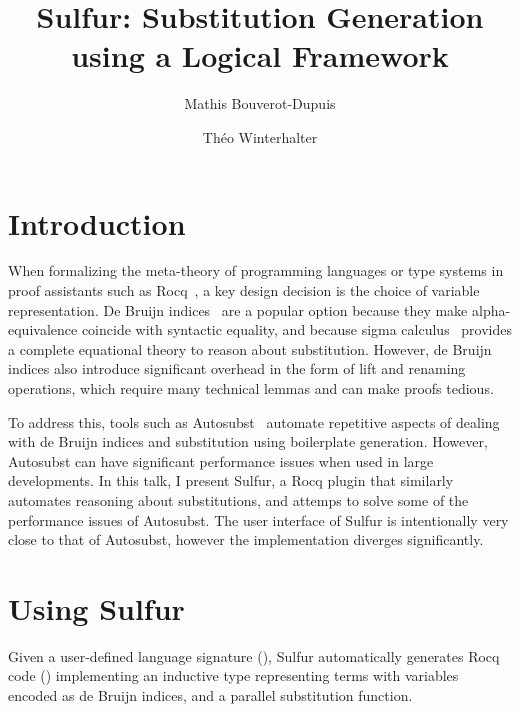 \documentclass[sigplan,review,anonymous]{acmart}
\title{Sulfur: Substitution Generation using a Logical Framework}
\author{
  Mathis Bouverot-Dupuis
  \and
  Théo Winterhalter
}
\begin{document}
\maketitle

\section{Introduction}

When formalizing the meta-theory of programming languages or type systems
in proof assistants
such as Rocq~\cite{rocq}, a key design decision is the choice of
variable representation.
De Bruijn indices~\cite{de-bruijn-indices} are a popular option
because they make alpha-equivalence
coincide with syntactic equality, and because sigma
calculus~\cite{sigma-calculus, sigma-calculus-completeness} provides a
complete equational theory to reason about substitution.
However, de Bruijn indices also introduce significant
overhead in the form of lift and renaming operations, which require many
technical lemmas and can make proofs tedious.

To address this, tools such as
Autosubst~\cite{autosubst-1,autosubst-2} automate
repetitive aspects of
dealing with de Bruijn indices and substitution using boilerplate generation.
However, Autosubst can have significant performance issues when used in large
developments.
In this talk, I present Sulfur, a Rocq plugin that similarly
automates reasoning
about substitutions, and attemps to solve some of the performance
issues of Autosubst.
The user interface of Sulfur is intentionally very close to that
of Autosubst,
however the implementation diverges significantly.

\section{Using Sulfur}

Given a user-defined language signature (), Sulfur
automatically generates Rocq code ()
implementing an inductive type representing terms
with variables encoded as de Bruijn indices, and a parallel
substitution function.
\end{document}
